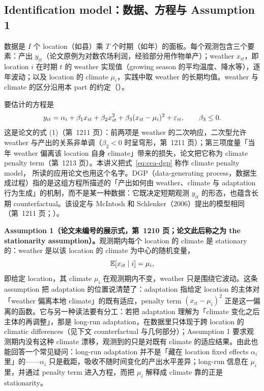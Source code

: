 \subsection{Identification model：数据、方程与 Assumption 1}

数据是 $I$ 个 location（如县）乘 $T$ 个时期（如年）的面板。每个观测包含三个要素：产出 $y_{it}$（论文原例为对数农场利润，经验部分用作物单产）；weather $x_{it}$，即 location $i$ 在时期 $t$ 的 weather 实现值（growing season 的平均温度、降水等），逐年波动；以及 location 的 climate $\mu_i$，实践中取 weather 的长期均值。weather 与 climate 的区分沿用本 part 的约定（）。

要估计的方程是
\begin{equation}
y_{it} = \alpha_i + \beta_1 x_{it} + \beta_2 x_{it}^2 + \beta_3 (x_{it}-\mu_i)^2 + \varepsilon_{it},
\qquad \beta_3 \le 0 .
\label{eq:cca-dgp}
\end{equation}
这是论文的式 (1)（第~1211 页）：前两项是 weather 的二次响应，二次型允许 weather 与产出的关系非单调（$\beta_2<0$ 时呈穹形，第~1211 页）；第三项度量「当年 weather 偏离该 location 自身 climate」带来的损失，论文把它称为 climate penalty term（第~1213 页）。本讲义把式~\ref{eq:cca-dgp} 称作 climate penalty model， 所读的应用论文也用这个名字。DGP（data-generating process，数据生成过程）指的是这组方程所描述的「产出如何由 weather、climate 与 adaptation 行为生成」的机制，而不是某一种数据：它既决定短期观测 $y_{it}$ 的形态，也蕴含长期 counterfactual。该设定与 McIntosh 和 Schlenker（2006）提出的模型相同（第~1211 页；\citealp{mcintosh2006identifying}）。

\textbf{Assumption 1（论文未编号的展示式，第~1210 页；论文此后称之为 the stationarity assumption）。}观测期内每个 location 的 climate 是 stationary 的：weather 是以该 location 的 climate 为中心的随机变量，
\begin{equation}
\mathbb{E}[x_{it} \mid i] = \mu_i ,
\label{eq:cca-climate}
\end{equation}
即给定 location，其 climate $\mu_i$ 在观测期内不变，weather 只是围绕它波动。这条 assumption 把 adaptation 的位置说清楚了：adaptation 指给定 location 的主体对「weather 偏离本地 climate」的既有适应，penalty term $(x_{it}-\mu_i)^2$ 正是这一偏离的函数。它与另一种读法要有分工：若把 adaptation 理解为「climate 变化之后主体的再调整」，那是 long-run adaptation，在数据里只体现于跨 location 的 climatic differences（见下文 counterfactual 与几何部分）；Assumption 1 要求观测期内没有这种 climate 漂移，观测到的只是对既有 climate 的适应结果。由此也能回答一个常见疑问：long-run adaptation 并不是「藏在 location fixed effects $\alpha_i$ 里」的——$\alpha_i$ 只是截距，吸收不随时间变化的产出水平差异；long-run 信息在 $\mu_i$ 里，并通过 penalty term 进入方程，而把 $\mu_i$ 解释成 climate 靠的正是 stationarity。

